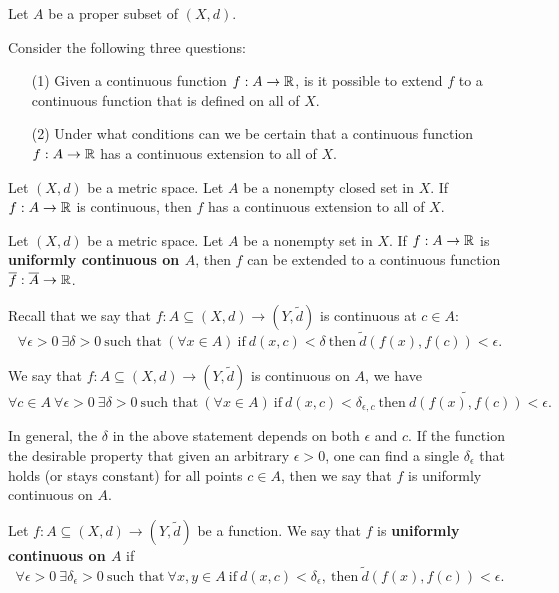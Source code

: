 \documentclass[a4paper]{article}
\begin{document}
Let \( A  \) be a proper subset of \( (X,d) \).

Consider the following three questions:

\begin{enumerate}
    \item[(1)] Given a continuous function \( f: A \to \mathbb{R}  \), is it possible to extend \( f  \) to a continuous function that is defined on all of \( X  \).
    \item[(2)] Under what conditions can we be certain that a continuous function \( f: A \to \mathbb{R}  \) has a continuous extension to all of \( X  \).
\end{enumerate}

\begin{theorem}
    Let \( (X,d) \) be a metric space. Let \( A  \) be a nonempty closed set in \( X  \). If \( f: A \to \mathbb{R}  \) is continuous, then \( f \) has a continuous extension to all of \( X  \).
\end{theorem}

\begin{theorem}[ ]
    Let \( (X,d) \) be a metric space. Let \( A  \) be a nonempty set in \( X  \). If \( f: A \to \mathbb{R}  \) is \textbf{uniformly continuous on \( A  \)}, then \( f  \) can be extended to a continuous function \( \overline{f} : \overline{A} \to \mathbb{R}  \).
\end{theorem}

Recall that we say that \( f: A \subseteq (X,d) \to (Y, \tilde{d}) \) is continuous at \( c \in A  \):
\[  \forall \epsilon > 0 \ \exists \delta > 0 \ \text{such that} \ (\forall x \in A ) \ \text{if} \ d(x,c) < \delta \ \text{then} \ \tilde{d}(f(x), f(c)) < \epsilon. \]

We say that \( f: A \subseteq  (X,d) \to (Y,\tilde{d}) \) is continuous on \( A  \), we have 
\[  \forall c \in A \  \forall \epsilon > 0 \ \exists \delta > 0 \ \text{such that} \ (\forall x \in A) \ \text{if} \ d(x,c) < \delta_{\epsilon, c} \ \text{then} \ \tilde{d(f(x), f(c))} < \epsilon.  \]

In general, the \( \delta  \) in the above statement depends on both \( \epsilon  \) and \( c  \). If the function the desirable property that given an arbitrary \( \epsilon > 0  \), one can find a single \( {\delta}_{\epsilon} \) that holds (or stays constant) for all points \( c \in A  \), then we say that \( f  \) is uniformly continuous on \( A  \).

\begin{definition}
    Let \( f: A \subseteq (X,d) \to (Y,\tilde{d}) \) be a function. We say that \( f \) is \textbf{uniformly continuous on \( A \)} if 
    \[  \forall \epsilon > 0 \ \exists {\delta}_{\epsilon} > 0 \ \text{such that} \ \forall x,y \in A \ \text{if} \ d(x,c) < {\delta}_{\epsilon}, \ \text{then} \ \tilde{d}(f(x),f(c)) < \epsilon. \]
\end{definition}
\end{document}
